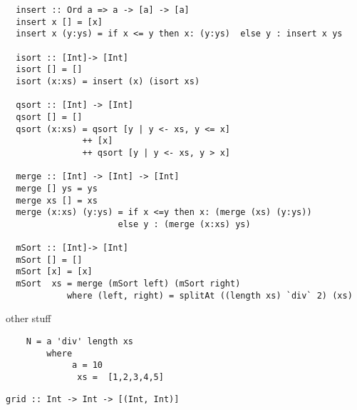 \documentclass{article}
\begin{document}
\begin{verbatim}
  insert :: Ord a => a -> [a] -> [a]
  insert x [] = [x]
  insert x (y:ys) = if x <= y then x: (y:ys)  else y : insert x ys

  isort :: [Int]-> [Int]
  isort [] = []
  isort (x:xs) = insert (x) (isort xs) 

  qsort :: [Int] -> [Int]
  qsort [] = []
  qsort (x:xs) = qsort [y | y <- xs, y <= x]
               ++ [x]
               ++ qsort [y | y <- xs, y > x]

  merge :: [Int] -> [Int] -> [Int]
  merge [] ys = ys
  merge xs [] = xs
  merge (x:xs) (y:ys) = if x <=y then x: (merge (xs) (y:ys))
                      else y : (merge (x:xs) ys)

  mSort :: [Int]-> [Int]
  mSort [] = []
  mSort [x] = [x]
  mSort  xs = merge (mSort left) (mSort right)
            where (left, right) = splitAt ((length xs) `div` 2) (xs)
\end{verbatim}



other stuff 
\begin{verbatim}
    N = a 'div' length xs 
        where
             a = 10
              xs =  [1,2,3,4,5]
\end{verbatim}


\begin{verbatim}
grid :: Int -> Int -> [(Int, Int)]
\end{verbatim}
\end{document}
